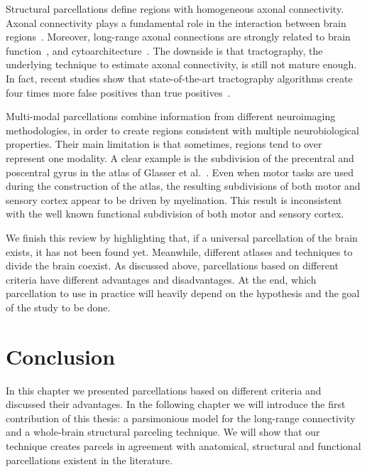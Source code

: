 Structural parcellations define regions with homogeneous axonal connectivity.
Axonal connectivity plays a fundamental role in the interaction between brain
regions~\citep{Schmahmann2006}. Moreover, long-range axonal connections are
strongly related to brain function~\citep{Passingham2002}, and
cytoarchitecture~\cite{Muircheartaigh2018}. The downside is that tractography,
the underlying technique to estimate axonal connectivity, is still 
not mature enough. In fact, recent studies show that state-of-the-art
tractography algorithms create four times more false positives than true
positives~\cite{Hein2016}.

Multi-modal parcellations combine information from different neuroimaging methodologies,
in order to create regions consistent with multiple neurobiological properties.
Their main limitation is that sometimes, regions tend to over represent one
modality. A clear example is the subdivision of the precentral and poscentral
gyrus in the atlas of Glasser et al.~\cite{Glasser2016}. Even when motor tasks
are used during the construction of the atlas, the resulting subdivisions of
both motor and sensory cortex appear to be driven by myelination. This
result is inconsistent with the well known functional subdivision of both motor
and sensory cortex.

We finish this review by highlighting that, if a universal parcellation of
the brain exists, it has not been found yet. Meanwhile, different atlases and
techniques to divide the brain coexist. As discussed above, parcellations based
on different criteria have different advantages and disadvantages. At the end,
which parcellation to use in practice will heavily depend on the hypothesis
and the goal of the study to be done.

\section{Conclusion}
In this chapter we presented parcellations based on different criteria and
discussed their advantages. In the following chapter we will introduce the
first contribution of this thesis: a parsimonious model for the long-range
connectivity and a whole-brain structural parceling technique. We will show
that our technique creates parcels in agreement with anatomical, structural
and functional parcellations existent in the literature.

\chapterbib
